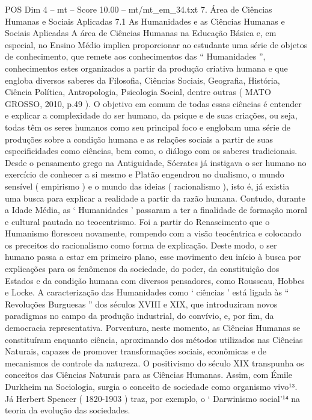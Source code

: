 \begin{textsample}{POS Dim 4 – mt – Score 10.00 – mt/mt\_em\_34.txt}  \label{ex:f4_pos_177}
7.
Área de Ciências Humanas e Sociais Aplicadas 7.1 As Humanidades e as Ciências Humanas e Sociais Aplicadas A área de Ciências Humanas na Educação Básica e, em especial, no Ensino Médio implica proporcionar ao estudante uma série de objetos de conhecimento, que remete aos conhecimentos das “ Humanidades ”, conhecimentos estes organizados a partir da produção criativa humana e que engloba diversos saberes da Filosofia, Ciências Sociais, Geografia, História, Ciência Política, Antropologia, Psicologia Social, dentre outras ( MATO GROSSO, 2010, p.49 ).
O objetivo em comum de todas essas ciências é entender e explicar a complexidade do ser humano, da psique e de suas criações, ou seja, todas têm os seres humanos como seu principal foco e englobam uma série de produções sobre a condição humana e as relações sociais a partir de suas especificidades como ciências, bem como, o diálogo com os saberes tradicionais.
Desde o pensamento grego na Antiguidade, Sócrates já instigava o ser humano no exercício de conhecer a si mesmo e Platão engendrou no dualismo, o mundo sensível ( empirismo ) e o mundo das ideias ( racionalismo ), isto é, já existia uma busca para explicar a realidade a partir da razão humana.
Contudo, durante a Idade Média, as ‘ Humanidades ’ passaram a ter a finalidade de formação moral e cultural pautada no teocentrismo.
Foi a partir do Renascimento que o Humanismo floresceu novamente, rompendo com a visão teocêntrica e colocando os preceitos do racionalismo como forma de explicação.
Deste modo, o ser humano passa a estar em primeiro plano, esse movimento deu início à busca por explicações para os fenômenos da sociedade, do poder, da constituição dos Estados e da condição humana com diversos pensadores, como Rousseau, Hobbes e Locke.
A caracterização das Humanidades como ‘ ciências ’ está ligada às “ Revoluções Burguesas ” dos séculos XVIII e XIX, que introduziram novos paradigmas no campo da produção industrial, do convívio, e, por fim, da democracia representativa.
Porventura, neste momento, as Ciências Humanas se constituíram enquanto ciência, aproximando dos métodos utilizados nas Ciências Naturais, capazes de promover transformações sociais, econômicas e de mecanismos de controle da natureza.
O positivismo do século XIX transpunha os conceitos das Ciências Naturais para as Ciências Humanas.
Assim, com Émile Durkheim na Sociologia, surgia o conceito de sociedade como organismo vivo¹³.
Já Herbert Spencer ( 1820-1903 ) traz, por exemplo, o ‘ Darwinismo social’¹⁴ na teoria da evolução das sociedades.

\end{textsample}
